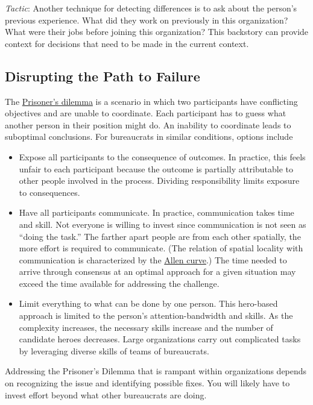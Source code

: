 \textit{Tactic}: Another technique for detecting differences is to ask about the person's previous experience. What did they work on previously in this organization? What were their jobs before joining this organization? This backstory can provide context for decisions that need to be made in the current context. 


\subsection*{Disrupting the Path to Failure}


The 
\href{https://en.wikipedia.org/wiki/Prisoner\%27s\_dilemma}{Prisoner's dilemma} 
\iftoggle{WPinmargin}{\marginpar{$>$Wikipedia: Prisoner's dilemma}}{}%
is a scenario in which two participants have conflicting objectives and are unable to coordinate.
\iftoggle{haspagenumbers}{ (See page~\pageref{prisoners_dilemma_explanation} for more details.)}{} Each participant has to guess what another person in their position might do. An inability to coordinate leads to suboptimal conclusions. For bureaucrats in similar conditions, options include
\begin{itemize}
    \item Expose all participants to the consequence of outcomes. In practice, this feels unfair to each participant because the outcome is partially attributable to other people involved in the process. Dividing responsibility limits exposure to consequences.
    \item Have all participants communicate. In practice, communication takes time and skill. Not everyone is willing to invest since communication is not seen as ``doing the task.'' The farther apart people are from each other spatially, the more effort is required to communicate. (The relation of spatial locality with communication is characterized by the \href{https://en.wikipedia.org/wiki/Allen\_curve}{Allen curve}.)
    \iftoggle{WPinmargin}{\marginpar{$>$Wikipedia: Allen curve}}{}
    The time needed to arrive through consensus at an optimal approach for a given situation may exceed the time available for addressing the challenge.
    \item Limit everything to what can be done by one person. This hero-based approach is limited to the person's attention-bandwidth and skills. As the complexity increases, the necessary skills increase and the number of candidate heroes decreases. Large organizations carry out complicated tasks by leveraging diverse skills of teams of bureaucrats.
\end{itemize}
Addressing the Prisoner's Dilemma that is rampant within organizations depends on recognizing the issue and identifying possible fixes. You will likely have to invest effort beyond what other bureaucrats are doing.

